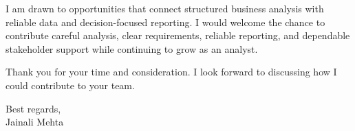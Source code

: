 \documentclass[letterpaper,10pt]{article}
\begin{document}
I am drawn to opportunities that connect structured business analysis with reliable data and decision-focused reporting. I would welcome the chance to contribute careful analysis, clear requirements, reliable reporting, and dependable stakeholder support while continuing to grow as an analyst.

Thank you for your time and consideration. I look forward to discussing how I could contribute to your team.

Best regards,\\[8pt]
Jainali Mehta
\end{document}
